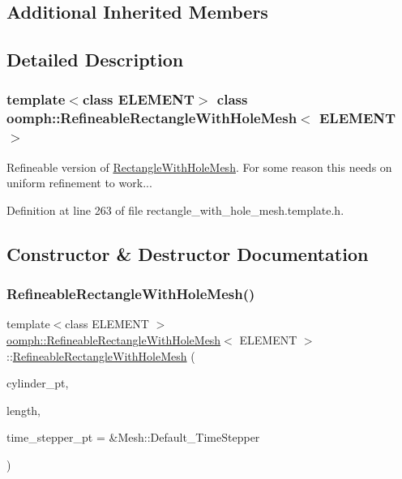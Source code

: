 \subsection*{Additional Inherited Members}


\subsection{Detailed Description}
\subsubsection*{template$<$class E\+L\+E\+M\+E\+NT$>$\newline
class oomph\+::\+Refineable\+Rectangle\+With\+Hole\+Mesh$<$ E\+L\+E\+M\+E\+N\+T $>$}

Refineable version of \hyperlink{classoomph_1_1RectangleWithHoleMesh}{Rectangle\+With\+Hole\+Mesh}. For some reason this needs on uniform refinement to work... 

Definition at line 263 of file rectangle\+\_\+with\+\_\+hole\+\_\+mesh.\+template.\+h.



\subsection{Constructor \& Destructor Documentation}
\mbox{\label{classoomph_1_1RefineableRectangleWithHoleMesh_a1b403fb6e31836c816e9a9cdfaa7703b}} 
\subsubsection{\texorpdfstring{Refineable\+Rectangle\+With\+Hole\+Mesh()}{RefineableRectangleWithHoleMesh()}}
{\footnotesize\ttfamily template$<$class E\+L\+E\+M\+E\+NT $>$ \\
\hyperlink{classoomph_1_1RefineableRectangleWithHoleMesh}{oomph\+::\+Refineable\+Rectangle\+With\+Hole\+Mesh}$<$ E\+L\+E\+M\+E\+NT $>$\+::\hyperlink{classoomph_1_1RefineableRectangleWithHoleMesh}{Refineable\+Rectangle\+With\+Hole\+Mesh} (\begin{DoxyParamCaption}\item[{Geom\+Object $\ast$}]{cylinder\+\_\+pt,  }\item[{const double \&}]{length,  }\item[{Time\+Stepper $\ast$}]{time\+\_\+stepper\+\_\+pt = {\ttfamily \&Mesh\+:\+:Default\+\_\+TimeStepper} }\end{DoxyParamCaption})\hspace{0.3cm}{\ttfamily [inline]}}




